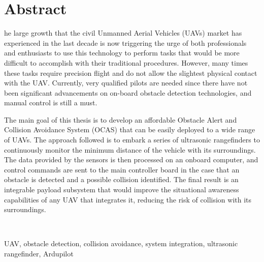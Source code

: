 %
%
%

\chapter*{Abstract}
\begin{SingleSpace}
he large growth that the civil Unmanned Aerial Vehicles (UAVs) market has experienced in the last decade is now triggering the urge of both professionals and enthusiasts to use this technology to perform tasks that would be more difficult to accomplish with their traditional procedures.
However, many times these tasks require precision flight and do not allow the slightest physical contact with the UAV. 
Currently, very qualified pilots are needed since there have not been significant advancements on on-board obstacle detection technologies, and manual control is still a must.

The main goal of this thesis is to develop an affordable Obstacle Alert and Collision Avoidance System (OCAS) that can be easily deployed to a wide range of UAVs.
The approach followed is to embark a series of ultrasonic rangefinders to continuously monitor the minimum distance of the vehicle with its surroundings.
The data provided by the sensors is then processed on an onboard computer, and control commands are sent to the main controller board in the case that an obstacle is detected and a possible collision identified.
The final result is an integrable payload subsystem that would improve the situational awareness capabilities of any UAV that integrates it, reducing the risk of collision with its surroundings.
\end{SingleSpace}
~\\
\begin{keywords}
	UAV, obstacle detection, collision avoidance, system integration, ultrasonic rangefinder, Ardupilot
\end{keywords}
\clearpage

